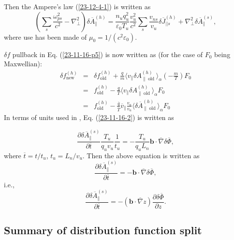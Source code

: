 \documentclass{llncs}
\newcommand{\tmop}[1]{\ensuremath{\operatorname{#1}}}
\newcommand{\tmtexttt}[1]{\text{{\ttfamily{#1}}}}
\begin{document}
Then the Ampere's law (\ref{23-12-4-1}) is written as
\begin{equation}
  \left( \sum_s \frac{\omega_{p s}^2}{c^2} - \nabla^2_{\perp} \right) \delta
  \overline{A}_{\parallel}^{(h)} = \frac{n_u q_u^2}{\varepsilon_0 T_u} 
  \frac{v_u^2}{c^2} \sum_s \frac{v_{n s}}{v_u} \delta \overline{J}_{||
  s}^{(h)} + \nabla^2_{\perp} \delta \overline{A}_{\parallel}^{(s)},
\end{equation}
where use has been made of $\mu_0 = 1 / (c^2 \varepsilon_0)$.

$\delta f$ pullback in Eq. (\ref{23-11-16-p5}) is now written as (for the case
of $F_0$ being Maxwellian):
\begin{eqnarray}
  \delta f^{(h)}_{\tmop{new}} & = & \delta f^{(h)}_{\tmop{old}} + \frac{q}{m}
  \langle v_{\parallel} \delta A_{\parallel \tmop{old}}^{(h)} \rangle_{\alpha}
  \left( - \frac{m}{T} \right) F_0 \nonumber\\
  & = & f^{(h)}_{\tmop{old}} - \frac{q}{T} \langle v_{\parallel} \delta
  A_{\parallel \tmop{old}}^{(h)} \rangle_{\alpha} F_0 \nonumber\\
  & = & f^{(h)}_{\tmop{old}} - \frac{\overline{q}}{\overline{T}}
  \overline{v}_{\parallel} \frac{v_n}{v_u} \langle \delta
  \overline{A}_{\parallel \tmop{old}}^{(h)} \rangle_{\alpha} F_0 
\end{eqnarray}
In terms of units used in \tmtexttt{TEK}, Eq. (\ref{23-11-16-2}) is written as


\[ \frac{\partial \delta \overline{A}_{\parallel}^{(s)}}{\partial
   \overline{t}} \frac{T_u}{q_u v_u}  \frac{1}{t_u} = - \frac{T_u}{q_u L_n}
   \mathbf{b} \cdot \overline{\nabla} \delta \overline{\Phi}, \]
where $\overline{t} = t / t_u$, $t_u = L_n / v_u$. Then the above equation is
written as
\begin{equation}
  \frac{\partial \delta \overline{A}_{\parallel}^{(s)}}{\partial \overline{t}}
  = -\mathbf{b} \cdot \overline{\nabla} \delta \overline{\Phi},
\end{equation}
i.e.,
\begin{equation}
  \frac{\partial \delta \overline{A}_{\parallel}^{(s)}}{\partial \overline{t}}
  = - (\mathbf{b} \cdot \overline{\nabla} z) \frac{\partial \delta
  \overline{\Phi}}{\partial z} .
\end{equation}


\subsection{Summary of distribution function split}\label{2023-10-31-p1}
\end{document}
